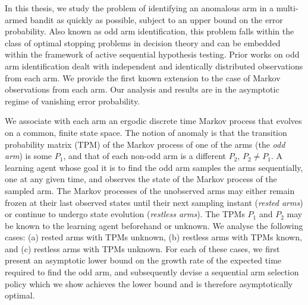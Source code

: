 

 
In this thesis, we study the problem of identifying an anomalous arm in a multi-armed bandit as quickly as possible, subject to an upper bound on the error probability. Also known as odd arm identification, this problem falls within the class of optimal stopping problems in decision theory and can be embedded within the framework of active sequential hypothesis testing. Prior works on odd arm identification dealt with independent and identically distributed observations from each arm. We provide the first known extension to the case of Markov observations from each arm. Our analysis and results are in the asymptotic regime of vanishing error probability.

We associate with each arm an ergodic discrete time Markov process that evolves on a common, finite state space. The notion of anomaly is that the transition probability matrix (TPM) of the Markov process of one of the arms (the {\em odd arm}) is some $P_{1}$, and that of each non-odd arm is a different $P_{2}$, $P_{2}\neq P_{1}$. A learning agent whose goal it is to find the odd arm samples the arms sequentially, one at any given time, and observes the state of the Markov process of the sampled arm. The Markov processes of the unobserved arms may either remain frozen at their last observed states until their next sampling instant ({\em rested arms}) or continue to undergo state evolution ({\em restless arms}). The TPMs $P_{1}$ and $P_{2}$ may be known to the learning agent beforehand or unknown. We analyse the following cases: (a) rested arms with TPMs unknown, (b) restless arms with TPMs known, and (c) restless arms with TPMs unknown. For each of these cases, we first present an asymptotic lower bound on the {\color{black} growth rate of the }expected time required to find the odd arm, and subsequently devise a sequential arm selection policy which we show achieves the lower bound and is therefore asymptotically optimal. 

